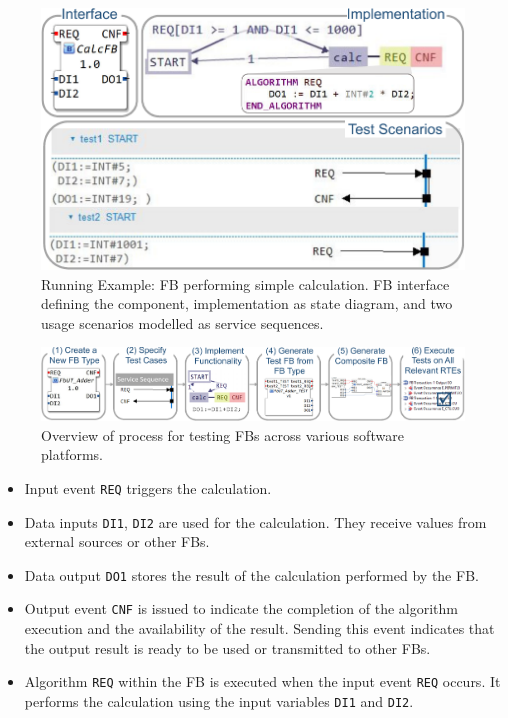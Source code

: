 \begin{bibunit}
\begin{figure}[htbp]
    \centering
    \vspace{-5mm}
    \includegraphics[width=0.95\columnwidth]{MX_Papers/Paper9/Figures/running_example-crop.pdf}
    \caption{Running Example: FB performing simple calculation. FB interface defining the component, implementation as state diagram, and two usage scenarios modelled as service sequences.}
    \label{fig:running_example}
\end{figure}
\begin{figure}[htbp]
	\centering
	\includegraphics[width=1\textwidth]{MX_Papers/Paper9/Figures/process-crop.pdf}
	\caption{Overview of process for testing FBs across various software platforms. }
	\label{methodology}
    \vspace{-5mm}
\end{figure}
\begin{itemize}
   \item Input event \texttt{REQ} triggers the calculation.
   \item Data inputs \texttt{DI1}, \texttt{DI2} are used for the calculation. They receive values from external sources or other FBs.
   \item Data output \texttt{DO1} stores the result of the calculation performed by the FB.
   \item Output event \texttt{CNF} is issued to indicate the completion of the algorithm execution and the availability of the result. Sending this event indicates that the output result is ready to be used or transmitted to other FBs.
   \item Algorithm \texttt{REQ} within the FB is executed when the input event \texttt{REQ} occurs. It performs the calculation using the input variables \texttt{DI1} and \texttt{DI2}.
   

\end{itemize}
\end{bibunit}
